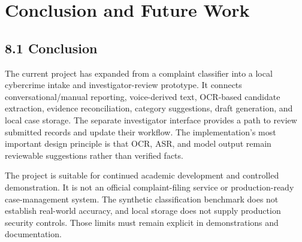 \documentclass[12pt,a4paper,oneside]{report}
\begin{document}
\clearpage\chapter{Conclusion and Future Work}
\section{8.1 Conclusion}
The current project has expanded from a complaint classifier into a local cybercrime intake and investigator-review prototype. It connects conversational/manual reporting, voice-derived text, OCR-based candidate extraction, evidence reconciliation, category suggestions, draft generation, and local case storage. The separate investigator interface provides a path to review submitted records and update their workflow. The implementation's most important design principle is that OCR, ASR, and model output remain reviewable suggestions rather than verified facts.

The project is suitable for continued academic development and controlled demonstration. It is not an official complaint-filing service or production-ready case-management system. The synthetic classification benchmark does not establish real-world accuracy, and local storage does not supply production security controls. Those limits must remain explicit in demonstrations and documentation.
\end{document}
